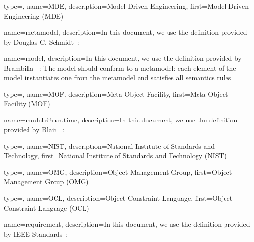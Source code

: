 {
	type=\acronymtype, 
	name={MDE},
	description={Model-Driven Engineering},
	first={Model-Driven Engineering (MDE)}
}

{
	name={meta\-model},
	description={In this document, we use the definition provided by Douglas C. \linebreak Schmidt~\cite{DBLP:journals/computer/Schmidt06}: }
}

{
	name={model},
	description={In this document, we use the definition provided by Brambilla \etal~\cite{DBLP:series/synthesis/2017Brambilla}:  The model should conform to a \gls{metamodel}: each element of the model instantiates one from the \gls{metamodel} and satisfies all semantics rules~\cite{DBLP:conf/iceccs/BezivinJT05}}
}

{
	type=\acronymtype, 
	name={MOF},
	description={Meta Object Facility},
	first={Meta Object Facility (MOF)}
}

{
	name={models@run.time},
	description={In this document, we use the definition provided by Blair \etal~\cite{DBLP:journals/computer/BlairBF09}: }
}

{
	type=\acronymtype,
	name={NIST},
	description={National Institute of Standards and Technology},
	first={National Institute of Standards and Technology (NIST)}
}

{
	type=\acronymtype,
	name={OMG},
	description={Object Management Group},
	first={Object Management Group (OMG)}
}

{
	type=\acronymtype,
	name={OCL},
	description={Object Constraint Language},
	first={Object Constraint Language (OCL)}
}


{
	name={requirement},
	description={In this document, we use the definition provided by IEEE Standards~\cite{iso2017systems}: }
}

